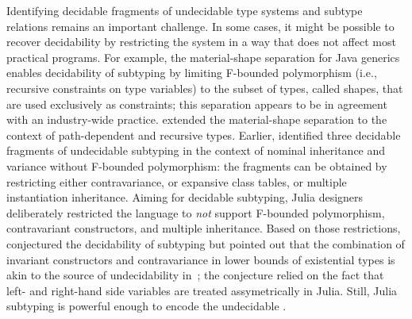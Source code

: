 Identifying decidable fragments of undecidable type systems and subtype
relations remains an important challenge.
In some cases, it might be possible to recover
decidability by restricting the system in a way that does not affect most
practical programs. For example, the material-shape separation for Java
generics~\cite{greenman:f-bound-material-shape:2014}
enables decidability of subtyping by limiting F-bounded polymorphism %
(i.e., recursive constraints on type variables)
to the subset of types, called shapes, that are used exclusively as constraints;
this separation appears to be in agreement with an industry-wide practice.
\citet{mackay:path-dep-dec:2020} extended the material-shape separation
to the context of path-dependent and recursive types. %
Earlier, \citet{kennedy:nom-sub-var-dec:2007} identified three decidable
fragments of undecidable subtyping in the context of nominal inheritance
and variance without F-bounded polymorphism: the fragments can be obtained by
restricting either contravariance, or expansive class tables,
or multiple instantiation inheritance.
Aiming for decidable subtyping, Julia designers deliberately restricted
the language to \emph{not} support F-bounded polymorphism, 
contravariant constructors, and multiple inheritance.
Based on those restrictions, \citet{bezanson:julia:2015} conjectured
the decidability of subtyping but pointed out that
the combination of invariant constructors
and contravariance in lower bounds of existential types
is akin to the source of undecidability in~\FSub;
the conjecture relied on the fact that left- and right-hand side variables
are treated assymetrically in Julia.
Still, Julia subtyping is powerful enough to encode
the undecidable \FSub.

